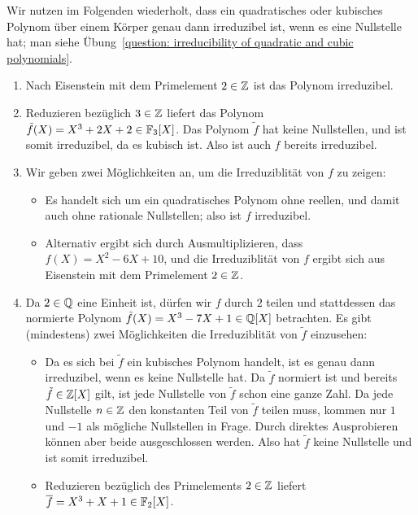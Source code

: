 \begin{solution}
  Wir nutzen im Folgenden wiederholt, dass ein quadratisches oder kubisches Polynom über einem Körper genau dann irreduzibel ist, wenn es eine Nullstelle hat; man siehe Übung~\ref{question: irreducibility of quadratic and cubic polynomials}.
  \begin{enumerate}
    \item
      Nach Eisenstein mit dem Primelement $2 \in \mathbb{Z}$ ist das Polynom irreduzibel.
    \item
      Reduzieren bezüglich $3 \in \mathbb{Z}$ liefert das Polynom $\tilde{f}(X) = X^3 + 2X + 2 \in \mathbb{F}_3[X]$.
      Das Polynom $\tilde{f}$ hat keine Nullstellen, und ist somit irreduzibel, da es kubisch ist.
      Also ist auch $f$ bereits irreduzibel.
    \item
      Wir geben zwei Möglichkeiten an, um die Irreduziblität von $f$ zu zeigen:
      \begin{itemize}
        \item
          Es handelt sich um ein quadratisches Polynom ohne reellen, und damit auch ohne rationale Nullstellen;
          also ist $f$ irreduzibel.
        \item
          Alternativ ergibt sich durch Ausmultiplizieren, dass $f(X) = X^2 - 6X + 10$, und die Irreduziblität von $f$ ergibt sich aus Eisenstein mit dem Primelement $2 \in \mathbb{Z}$.
      \end{itemize}
    \item
      Da $2 \in \mathbb{Q}$ eine Einheit ist, dürfen wir $f$ durch $2$ teilen und stattdessen das normierte Polynom $\tilde{f}(X) = X^3 - 7X + 1 \in \mathbb{Q}[X]$ betrachten.
      Es gibt (mindestens) zwei Möglichkeiten die Irreduziblität von $\tilde{f}$ einzusehen:
      \begin{itemize}
        \item
          Da es sich bei $\tilde{f}$ ein kubisches Polynom handelt, ist es genau dann irreduzibel, wenn es keine Nullstelle hat.
          Da $\tilde{f}$ normiert ist und bereits $\tilde{f} \in \mathbb{Z}[X]$ gilt, ist jede Nullstelle von $\tilde{f}$ schon eine ganze Zahl.
          Da jede Nullstelle $n \in \mathbb{Z}$ den konstanten Teil von $\tilde{f}$ teilen muss, kommen nur $1$ und $-1$ als mögliche Nullstellen in Frage. Durch direktes Ausprobieren können aber beide ausgeschlossen werden.
          Also hat $\tilde{f}$ keine Nullstelle und ist somit irreduzibel.
        \item
          Reduzieren bezüglich des Primelements $2 \in \mathbb{Z}$ liefert $\overline{f} = X^3 + X + 1 \in \mathbb{F}_2[X]$.

\end{itemize}
\end{enumerate}
\end{solution}
